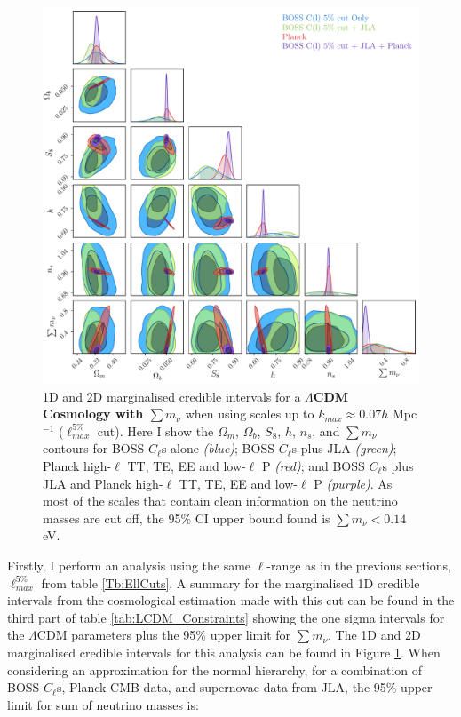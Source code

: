 \begin{figure}
\begin{center}
\includegraphics[width=\textwidth]{BOSS-FIGS/1Spec_Neutrino_NewPrior_LCDM_5pc.pdf}
\caption[1D and 2D marginalised credible intervals for a $\Lambda$CDM Cosmology with $\sum m_{\nu}$ when using scales up to $k_{max}\approx 0.07 h$ Mpc$^{-1}$]{1D and 2D marginalised credible intervals for a \textbf{$\Lambda$CDM Cosmology with $\sum m_{\nu}$} when using scales up to $k_{max}\approx 0.07 h$ Mpc$^{-1}$ ($\ell_{max}^{5\%}$ cut). Here I show the $\Omega_m$, $\Omega_b$, $S_8$, $h$, $n_s$, and $\sum m_{\nu}$ contours for BOSS $C_{\ell}$s alone \textit{(blue)}; BOSS $C_{\ell}$s plus JLA \textit{(green)}; Planck high-$\ell$ TT, TE, EE and low-$\ell$ P \textit{(red)}; and BOSS $C_{\ell}$s plus JLA and Planck high-$\ell$ TT, TE, EE and low-$\ell$ P \textit{(purple)}. As most of the scales that contain clean information on the neutrino masses are cut off, the 95\% CI upper bound found is $\sum m_{\nu} < 0.14$ eV.}
\label{fig:nuCDM5pc}
\end{center}
\end{figure}

\qquad Firstly, I perform an analysis using the same $\ell$-range as in the previous sections, $\ell_{max}^{5\%}$ from table \ref{Tb:EllCuts}. A summary for the marginalised 1D credible intervals from the cosmological estimation made with this cut can be found in the third part of table \ref{tab:LCDM_Constraints} showing the one sigma intervals for the $\Lambda$CDM parameters plus the 95\% upper limit for $\sum m_{\nu}$. The 1D and 2D marginalised credible intervals for this analysis can be found in Figure \ref{fig:nuCDM5pc}. When considering an approximation for the normal hierarchy, for a combination of BOSS $C_{\ell}$s, Planck CMB data, and supernovae data from JLA, the 95\% upper limit for sum of neutrino masses is:

